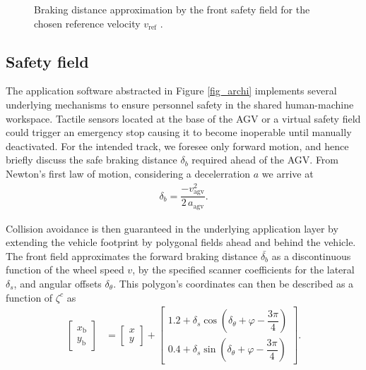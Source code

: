 \begin{figure}[t]
    \begin{center}
        \def\svgwidth{1.05\textwidth}
        
        \caption{Braking distance approximation by the front safety field for the chosen reference velocity $v_{\mathrm{ref}}$ \cite{malitzky_markus_mechanical_nodate}.}
        \label{braking}
    \end{center}
\end{figure}

\subsection{Safety field}\label{safety_field}
The application software abstracted in Figure \ref{fig_archi} implements several underlying mechanisms to ensure personnel safety in the shared human-machine workspace. Tactile sensors located at the base of the \ac{AGV} or a virtual safety field could trigger an emergency stop causing it to become inoperable until manually deactivated. For the intended track, we foresee only forward motion, and hence briefly discuss the safe braking distance $\delta_{b}$ required ahead of the \ac{AGV}. From Newton's first law of motion, considering a decelerration $a$ we arrive at  
\begin{align}
    \delta_{b} = \dfrac{-v^{2}_{\mathrm{agv}}}{2\,a_{\mathrm{agv}}}.
\end{align}

Collision avoidance is then guaranteed in the underlying application layer by extending the vehicle footprint by polygonal fields ahead and behind the vehicle. The front field approximates the forward braking distance $\bar{\delta_{b}}$ as a discontinuous function of the wheel speed $v$, by the specified scanner coefficients for the lateral $\delta_{s}$, and angular offsets $\delta_{\theta}$. This polygon's coordinates can then be described as a function of $\zeta^{c}$ as
\begin{align}
    \begin{bmatrix}
        x_{\mathrm{b}}\\
        y_{\mathrm{b}}
    \end{bmatrix} &=
    \begin{bmatrix}
        x\\
        y
    \end{bmatrix} +
    \begin{bmatrix}
        1.2 + \delta_{s} \cos(\delta_{\theta} + \varphi - \dfrac{3\pi}{4})\\
        0.4 + \delta_{s} \sin(\delta_{\theta} + \varphi - \dfrac{3\pi}{4})\label{polygon_coord}
    \end{bmatrix}.
\end{align}
    
